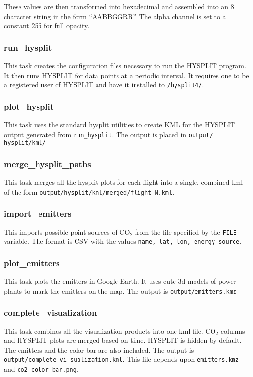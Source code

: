 \documentclass[12pt]{article}
\begin{document}
These values are then transformed into hexadecimal and assembled into an 8 character string in the form ``AABBGGRR''.  The alpha channel is set to a constant 255 for full opacity.

\subsubsection*{run\_hysplit}

This task creates the configuration files necessary to run the HYSPLIT program.  It then runs HYSPLIT for data points at a periodic interval.  It requires one to be a registered user of HYSPLIT and have it installed to \texttt{/hysplit4/}.

\subsubsection*{plot\_hysplit}

This task uses the standard hysplit utilities to create KML for the HYSPLIT output generated from \texttt{run\_hysplit}.  The output is placed in \texttt{output/ hysplit/kml/}

\subsubsection*{merge\_hysplit\_paths}

This task merges all the hysplit plots for each flight into a single, combined kml of the form \texttt{output/hysplit/kml/merged/flight\_N.kml}.

\subsubsection*{import\_emitters}

This imports possible point sources of CO$_2$ from the file specified by the \texttt{FILE} variable.  The format is CSV with the values \texttt{name, lat, lon, energy source}.

\subsubsection*{plot\_emitters}

This task plots the emitters in Google Earth.  It uses cute 3d models of power plants to mark the emitters on the map. The output is \texttt{output/emitters.kmz}

\subsubsection*{complete\_visualization}

This task combines all the visualization products into one kml file.  CO$_2$ columns and HYSPLIT plots are merged based on time.  HYSPLIT is hidden by default.  The emitters and the color bar are also included.  The output is \texttt{output/complete\_vi sualization.kml}.  This file depends upon \texttt{emitters.kmz} and \texttt{co2\_color\_bar.png}.
\end{document}
